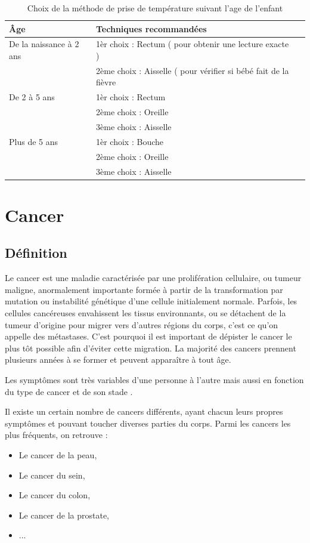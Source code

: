 \documentclass[12pt]{article}
\begin{document}
\begin{table}[h]
	\centering
	\caption{Choix de la méthode de prise de température suivant l’age de l’enfant}
	\begin{tabular}{ | l | l | c }
		\hline
		\bfseries{Âge} & \bfseries{Techniques recommandées}\\ \hline
		De la naissance à 2 ans & 1èr choix : Rectum ( pour obtenir une lecture exacte )\\
		                                      &  2ème choix : Aisselle ( pour vérifier si bébé fait de la fièvre\\
\hline
		De 2 à 5 ans & 1èr choix : Rectum\\
							& 2ème choix : Oreille\\
							& 3ème choix : Aisselle\\ 
\hline
		Plus de 5 ans & 1èr choix : Bouche\\
							  & 2ème choix : Oreille\\
							  & 3ème choix : Aisselle\\ 
\hline 
	\end{tabular}
\end{table}

\section{Cancer}
\subsection{Définition}
Le cancer est une maladie caractérisée par une prolifération cellulaire, ou tumeur maligne, anormalement importante formée à partir de la transformation par mutation ou instabilité génétique d'une cellule initialement normale. Parfois, les cellules cancéreuses envahissent les tissus environnants, ou se détachent de la tumeur d'origine pour migrer vers d'autres régions du corps, c'est ce qu'on appelle des métastases. C'est pourquoi il est important de dépister le cancer le plus tôt possible afin d'éviter cette migration. La majorité des cancers prennent plusieurs années à se former et peuvent apparaître à tout âge. 

Les symptômes sont très variables d'une personne à l'autre mais aussi en fonction du type de cancer et de son stade \cite{31}.

Il existe un certain nombre de cancers différents, ayant chacun leurs propres symptômes et pouvant toucher diverses parties du corps. Parmi les cancers les plus fréquents, on retrouve :
\begin{itemize}
	\item  Le cancer de la peau,
	\item Le cancer du sein,
	\item Le cancer du colon,
	\item Le cancer de la prostate,
	\item ...
\end{itemize}
\end{document}
